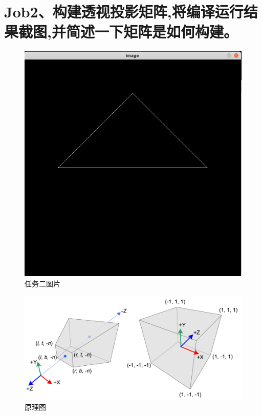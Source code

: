 \documentclass[a4paper,12pt]{article}
\begin{document}
\section{\kaishu Job2、构建透视投影矩阵,将编译运行结果截图,并简述一下矩阵是如何构建。}
\begin{figure}[H]
    \centering
    \includegraphics[width=1\textwidth]{job2.png}
    \caption{任务二图片}
\end{figure}
\par
\begin{figure}[H]
    \centering
    \includegraphics[width=1\textwidth]{gl_projectionmatrix01.png}
    \caption{原理图}
\end{figure}
\end{document}

